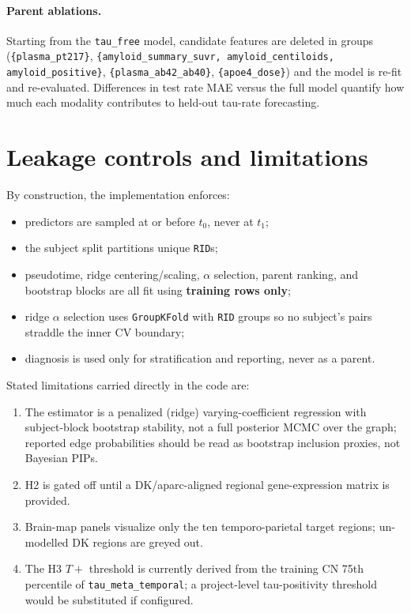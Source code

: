 \documentclass[11pt]{article}
\newcommand{\code}[1]{\texttt{#1}}
\begin{document}
\paragraph{Parent ablations.} Starting from the \code{tau\_free} model,
candidate features are deleted in groups (\code{\{plasma\_pt217\}},
\code{\{amyloid\_summary\_suvr, amyloid\_centiloids, amyloid\_positive\}},
\code{\{plasma\_ab42\_ab40\}}, \code{\{apoe4\_dose\}}) and the model is
re-fit and re-evaluated. Differences in test rate MAE versus the full
model quantify how much each modality contributes to held-out tau-rate
forecasting.

\section{Leakage controls and limitations}

By construction, the implementation enforces:
\begin{itemize}[leftmargin=*,nosep]
  \item predictors are sampled at or before $t_0$, never at $t_1$;
  \item the subject split partitions unique \code{RID}s;
  \item pseudotime, ridge centering/scaling, $\alpha$ selection, parent ranking, and bootstrap blocks are all fit using \textbf{training rows only};
  \item ridge $\alpha$ selection uses \code{GroupKFold} with \code{RID} groups so no subject's pairs straddle the inner CV boundary;
  \item diagnosis is used only for stratification and reporting, never as a parent.
\end{itemize}

Stated limitations carried directly in the code are:
\begin{enumerate}[leftmargin=*,nosep]
  \item The estimator is a penalized (ridge) varying-coefficient regression with subject-block bootstrap stability, not a full posterior MCMC over the graph; reported edge probabilities should be read as bootstrap inclusion proxies, not Bayesian PIPs.
  \item H2 is gated off until a DK/aparc-aligned regional gene-expression matrix is provided.
  \item Brain-map panels visualize only the ten temporo-parietal target regions; un-modelled DK regions are greyed out.
  \item The H3 $T+$ threshold is currently derived from the training CN 75th percentile of \code{tau\_meta\_temporal}; a project-level tau-positivity threshold would be substituted if configured.
\end{enumerate}
\end{document}
